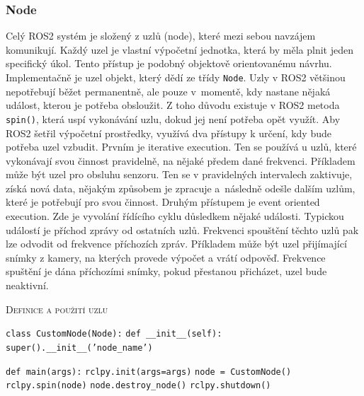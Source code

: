 \subsubsection*{Node}
Celý ROS2 systém je složený z uzlů (node), které mezi sebou navzájem komunikují. Každý uzel je vlastní výpočetní jednotka, která by měla plnit jeden specifický úkol. Tento přístup je podobný objektově orientovanému návrhu. Implementačně je uzel objekt, který dědí ze třídy \verb|Node|. \cite{ros2_documentation}
Uzly v ROS2 většinou nepotřebují běžet permanentně, ale pouze v~momentě, kdy nastane nějaká událost, kterou je potřeba obsloužit. Z toho důvodu existuje v ROS2 metoda \verb|spin()|, která uspí vykonávání uzlu, dokud jej není potřeba opět využít. Aby ROS2 šetřil výpočetní prostředky, využívá dva přístupy k určení, kdy bude potřeba uzel vzbudit. Prvním je iterative execution. Ten se používá u uzlů, které vykonávají svou činnost pravidelně, na nějaké předem dané frekvenci. Příkladem může být uzel pro obsluhu senzoru. Ten se v pravidelných intervalech zaktivuje, získá nová data, nějakým způsobem je zpracuje a~následně odešle dalším uzlům, které je potřebují pro svou činnost.
Druhým přístupem je event oriented execution. Zde je vyvolání řídícího cyklu důsledkem nějaké události. Typickou událostí je příchod zprávy od ostatních uzlů. Frekvenci spouštění těchto uzlů pak lze odvodit od frekvence příchozích zpráv. Příkladem může být uzel přijímající snímky z kamery, na kterých provede výpočet a vrátí odpověď. Frekvence spuštění je dána příchozími snímky, pokud přestanou přicházet, uzel bude neaktivní. \cite[str:~6]{ros2_introduction}

\begin{algorithm}[h!]
	\label{}
	\caption{\textsc{Definice a použití uzlu}}
	
	\DontPrintSemicolon
	\SetAlgoNoLine
	\SetNlSty{}{}{:}
	\SetNlSkip{-1.1em}
	
	\BlankLine \Indp\Indpp
	
	\texttt{class CustomNode(Node):}\;
	\Indp\Indp
	\texttt{def \_\_init\_\_(self):}\;
	\Indp\Indp
	\texttt{super().\_\_init\_\_('node\_name')}\;
	\Indm\Indm\Indm\Indm
	
	\BlankLine
	
	\texttt{def main(args):}\;
	\Indp\Indp
	\texttt{rclpy.init(args=args)}\;
	\texttt{node = CustomNode()}\;
	\texttt{rclpy.spin(node)}\;
	\texttt{node.destroy\_node()}\;
	\texttt{rclpy.shutdown()}\;
\end{algorithm}

